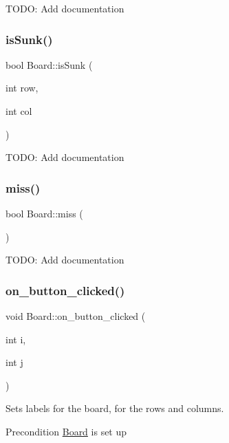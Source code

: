 T\+O\+DO\+: Add documentation \mbox{\label{classBoard_a56efd14031412179435e32a4a6f64f8f}} 
\subsubsection{\texorpdfstring{isSunk()}{isSunk()}\hspace{0.1cm}{\footnotesize\ttfamily [2/2]}}
{\footnotesize\ttfamily bool Board\+::is\+Sunk (\begin{DoxyParamCaption}\item[{int}]{row,  }\item[{int}]{col }\end{DoxyParamCaption})}

T\+O\+DO\+: Add documentation \mbox{\label{classBoard_a058b6c42434ce8f8f313cc78ebcaac74}} 
\subsubsection{\texorpdfstring{miss()}{miss()}}
{\footnotesize\ttfamily bool Board\+::miss (\begin{DoxyParamCaption}{ }\end{DoxyParamCaption})}

T\+O\+DO\+: Add documentation \mbox{\label{classBoard_a44a9162801e5db0c3b4e54d002038601}} 
\subsubsection{\texorpdfstring{on\_button\_clicked()}{on\_button\_clicked()}}
{\footnotesize\ttfamily void Board\+::on\+\_\+button\+\_\+clicked (\begin{DoxyParamCaption}\item[{int}]{i,  }\item[{int}]{j }\end{DoxyParamCaption})\hspace{0.3cm}{\ttfamily [protected]}}



Sets labels for the board, for the rows and columns. 

\begin{DoxyPrecond}{Precondition}
\mbox{\hyperlink{classBoard}{Board}} is set up 
\end{DoxyPrecond}
\mbox{\label{classBoard_a92231a5cc243d7a7901c5e72ce289eb9}} 
